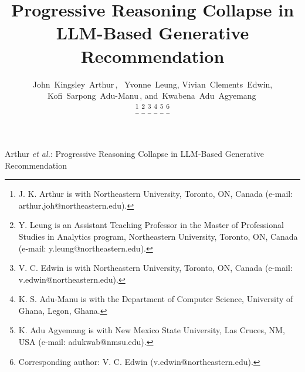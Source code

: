 \documentclass[lettersize,journal]{IEEEtran}
\begin{document}
\title{Progressive Reasoning Collapse in LLM-Based Generative Recommendation}

\author{John~Kingsley~Arthur\,,~
        Yvonne~Leung,
        Vivian~Clements~Edwin,
        Kofi~Sarpong~Adu-Manu\,,
        and~Kwabena~Adu~Agyemang\,
        
\thanks{J. K. Arthur is with Northeastern University, Toronto, ON, Canada (e-mail: arthur.joh@northeastern.edu).}%
\thanks{Y. Leung is an Assistant Teaching Professor in the Master of Professional Studies in Analytics program, Northeastern University, Toronto, ON, Canada (e-mail: y.leung@northeastern.edu).}%
\thanks{V. C. Edwin is with Northeastern University, Toronto, ON, Canada (e-mail: v.edwin@northeastern.edu).}%
\thanks{K. S. Adu-Manu is with the Department of Computer Science, University of Ghana, Legon, Ghana.}%
\thanks{K. Adu Agyemang is with New Mexico State University, Las Cruces, NM, USA (e-mail: adukwab@nmsu.edu).}%
\thanks{Corresponding author: V. C. Edwin (v.edwin@northeastern.edu).}}

%
{Arthur \textit{et al.}: Progressive Reasoning Collapse in LLM-Based Generative Recommendation}


\maketitle
\end{document}
